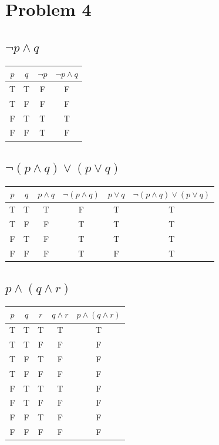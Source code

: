 \documentclass[a4paper, 10pt]{article}
\begin{document}
    \pagebreak
    \section{Problem 4}

        \subsection{\( \neg p \land q \)}
            \begin{tabular}{|c|c|c|c|}
                \hline
                \( p \) & \( q \) & \( \neg p \) & \( \neg p \land q \) \\
                \hline
                T & T & F & F \\
                T & F & F & F \\
                F & T & T & T \\
                F & F & T & F \\
                \hline
            \end{tabular}

        \subsection{\( \neg(p \land q) \lor (p \lor q) \)}
            \begin{tabular}{|c|c|c|c|c|c|}
                \hline
                \( p \) & \( q \) & \( p \land q \) & \( \neg(p \land q) \) & \( p \lor q \) & \( \neg(p \land q) \lor (p \lor q) \) \\
                \hline
                T & T & T & F & T & T \\
                T & F & F & T & T & T \\
                F & T & F & T & T & T \\
                F & F & F & T & F & T \\
                \hline
            \end{tabular}

        \subsection{\( p \land (q \land r) \)}
            \begin{tabular}{|c|c|c|c|c|}
                \hline
                \( p \) & \( q \) & \( r \) & \( q \land r \) & \( p \land (q \land r) \) \\
                \hline
                T & T & T & T & T \\
                T & T & F & F & F \\
                T & F & T & F & F \\
                T & F & F & F & F \\
                F & T & T & T & F \\
                F & T & F & F & F \\
                F & F & T & F & F \\
                F & F & F & F & F \\
                \hline
            \end{tabular}
\end{document}

